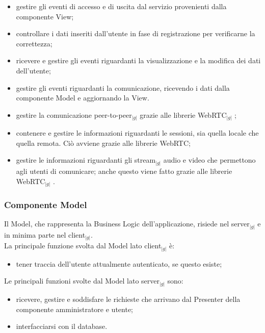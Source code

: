 \begin{itemize}
\item gestire gli eventi di accesso e di uscita dal servizio provenienti dalla componente View;
\item controllare i dati inseriti dall'utente in fase di registrazione per verificarne la correttezza;
\item ricevere e gestire gli eventi riguardanti la visualizzazione e la modifica dei dati dell'utente;
\item gestire gli eventi riguardanti la comunicazione, ricevendo i dati dalla componente Model e aggiornando la View.
\item gestire la comunicazione peer-to-peer$_{|g|}$ grazie alle librerie WebRTC$_{|g|}$ ;
\item contenere e gestire le informazioni riguardanti le sessioni, sia quella locale che quella remota. Ciò avviene grazie alle librerie WebRTC\g;
\item gestire le informazioni riguardanti gli stream$_{|g|}$ audio e video che permettono agli utenti di comunicare; anche questo viene fatto grazie alle librerie WebRTC$_{|g|}$ .
\end{itemize}

\subsubsection{Componente Model}
\noindent Il Model, che rappresenta la Business Logic dell'applicazione,  risiede nel server$_{|g|}$ e in minima parte nel client$_{|g|}$.\\
La principale funzione svolta dal Model lato client$_{|g|}$ è:
\begin{itemize}
\item tener traccia dell'utente attualmente autenticato, se questo esiste;
\end{itemize}
\noindent Le principali funzioni svolte dal Model lato server$_{|g|}$ sono:
\begin{itemize}
\item ricevere, gestire e soddisfare le richieste che arrivano dal Presenter della componente amministratore e utente;
\item interfacciarsi con il database\g.
\end{itemize}